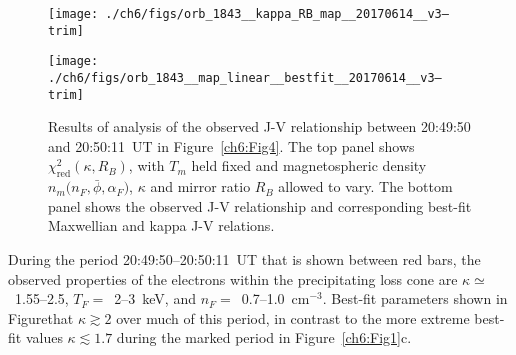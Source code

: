   \begin{figure}
    \centering

    \noindent\texttt{[image: ./ch6/figs/orb\_1843\_\_kappa\_RB\_map\_\_20170614\_\_v3--trim]}

    \vspace{1cm}

    \noindent\texttt{[image: ./ch6/figs/orb\_1843\_\_map\_linear\_\_bestfit\_\_20170614\_\_v3--trim]}




    \caption[Orbit 1843: Reduced chi-squared values for observed J-V
    relationship and corresponding best-fit J-V curves.]{Results of analysis of
      the observed J-V relationship between 20:49:50 and 20:50:11~UT in
      Figure~\ref{ch6:Fig4}. The top panel shows
      $\chi^2_{\mathrm{red}} ( \kappa, R_B)$, with $T_m$ held fixed and
      magnetospheric density $n_m \big ( n_F, \bar{\phi}, \alpha_F \big )$,
      $\kappa$ and mirror ratio $R_B$ allowed to vary. The bottom panel shows
      the observed J-V relationship and corresponding best-fit Maxwellian and
      kappa J-V relations.}
    \label{ch6:Fig6}
  \end{figure}


  During the period 20:49:50--20:50:11~UT that is shown between red bars, the
  observed properties of the electrons within the precipitating loss cone are
  $\kappa \simeq $~1.55--2.5, $T_F =$~2--3~keV, and $n_F =$~0.7--1.0~cm$^{-3}$.
  Best-fit parameters shown in Figure\DIFdelbegin {}\DIFdelend \DIFaddbegin {}\DIFaddend that
  $\kappa \gtrsim 2$ over much of this period, in contrast to the more extreme
  best-fit values $\kappa \lesssim 1.7$ during the marked period in
  Figure~\ref{ch6:Fig1}c.

